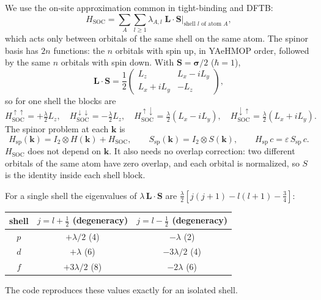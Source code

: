 \documentclass[11pt,a4paper]{article}
\newcommand{\Hsoc}{H_{\mathrm{SOC}}}
\begin{document}
We use the on-site approximation common in tight-binding and DFTB:
\begin{equation}
\Hsoc = \sum_{A}\sum_{l\ge1} \lambda_{A,l}\; \mathbf{L}\cdot\mathbf{S}
\Big|_{\text{shell } l \text{ of atom } A},
\end{equation}
which acts only between orbitals of the same shell on the same atom. The spinor basis
has $2n$ functions: the $n$ orbitals with spin up, in YAeHMOP order, followed by the same
$n$ orbitals with spin down. With $\mathbf{S}=\boldsymbol{\sigma}/2$ ($\hbar=1$),
\begin{equation}
\mathbf{L}\cdot\mathbf{S} = \frac12\begin{pmatrix} L_z & L_x - iL_y\\ L_x + iL_y & -L_z\end{pmatrix},
\end{equation}
so for one shell the blocks are
\begin{equation}
\Hsoc^{\uparrow\uparrow} = +\tfrac{\lambda}{2}L_z,\quad
\Hsoc^{\downarrow\downarrow} = -\tfrac{\lambda}{2}L_z,\quad
\Hsoc^{\uparrow\downarrow} = \tfrac{\lambda}{2}(L_x - iL_y),\quad
\Hsoc^{\downarrow\uparrow} = \tfrac{\lambda}{2}(L_x + iL_y).
\end{equation}
The spinor problem at each $\mathbf{k}$ is
\begin{equation}
H_{\mathrm{sp}}(\mathbf{k}) = I_2\otimes H(\mathbf{k}) + \Hsoc,\qquad
S_{\mathrm{sp}}(\mathbf{k}) = I_2\otimes S(\mathbf{k}),\qquad
H_{\mathrm{sp}}\,c = \varepsilon\, S_{\mathrm{sp}}\,c .
\end{equation}
$\Hsoc$ does not depend on $\mathbf{k}$. It also needs no overlap correction: two
different orbitals of the same atom have zero overlap, and each orbital is normalized, so
$S$ is the identity inside each shell block.

For a single shell the eigenvalues of $\lambda\,\mathbf{L}\cdot\mathbf{S}$ are
$\frac{\lambda}{2}[j(j+1)-l(l+1)-\frac34]$:

\begin{center}
\begin{tabular}{c c c}
\toprule
shell & $j=l+\frac12$ (degeneracy) & $j=l-\frac12$ (degeneracy) \\
\midrule
$p$ & $+\lambda/2$ (4) & $-\lambda$ (2) \\
$d$ & $+\lambda$ (6) & $-3\lambda/2$ (4) \\
$f$ & $+3\lambda/2$ (8) & $-2\lambda$ (6) \\
\bottomrule
\end{tabular}
\end{center}
The code reproduces these values exactly for an isolated shell.
\end{document}
